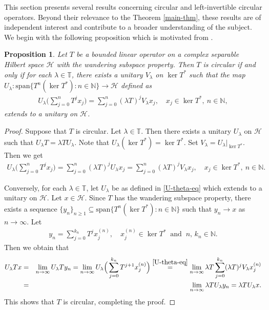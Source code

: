 \documentclass[10pt,a4paper]{amsart}
\newtheorem{proposition}[theorem]{Proposition}%
\newcommand{\beqn}{\begin{eqnarray*}}
\newcommand{\eeqn}{\end{eqnarray*}}
\newcommand{\beq}{\begin{eqnarray}}
\newcommand{\eeq}{\end{eqnarray}}
\newcommand{\rar}{\rightarrow}
\begin{document}
This section presents several results concerning circular and left-invertible circular operators. Beyond their relevance to the Theorem \ref{main-thm}, these results are of independent interest and contribute to a broader understanding of the subject. We begin with the following proposition which is motivated from \cite[Lemma 2.3]{GKMP}.

\begin{proposition}
Let $T$ be a bounded linear operator on a complex separable Hilbert space $\mathcal H$ with the wandering subspace property. Then $T$ is circular if and only if for each $\lambda \in \mathbb T$, there exists a unitary $V_\lambda$ on $\ker T^*$ such that the map $U_\lambda : \mathrm{span}\{T^n(\ker T^*) : n \in \mathbb N\} \rar \mathcal H$ defined as
\beq\label{U-theta-eq}
U_\lambda \Big(\sum_{j=0}^n T^j x_j \Big) = \sum_{j=0}^n (\lambda T)^j V_\lambda x_j, \quad x_j \in \ker T^*, \ n \in \mathbb N,
\eeq
extends to a unitary on $\mathcal H$.
\end{proposition}

\begin{proof}
Suppose that $T$ is circular. Let $\lambda \in \mathbb T$. Then there exists a unitary $U_\lambda$ on $\mathcal H$ such that $U_\lambda T = \lambda T U_\lambda$. Note that $U_\lambda(\ker T^*) = \ker T^*$. Set $V_\lambda = U_\lambda|_{\ker T^*}$. Then we get
\beqn
U_\lambda \Big(\sum_{j=0}^n T^j x_j \Big) = \sum_{j=0}^n (\lambda T)^j U_\lambda x_j = \sum_{j=0}^n (\lambda T)^j V_\lambda x_j, \quad x_j \in \ker T^*, \ n \in \mathbb N.
\eeqn

Conversely, for each $\lambda \in \mathbb T$, let $U_\lambda$ be as defined in \eqref{U-theta-eq} which extends to a unitary on $\mathcal H$. Let $x \in \mathcal H$. Since $T$ has the wandering subspace property, there exists a sequence $\{y_n\}_{n \geqslant 1} \subseteq \mathrm{span}\{T^n(\ker T^*) : n \in \mathbb N\}$ such that $y_n \rar x$ as $n \rar \infty$. Let 
\beqn
y_n = \sum_{j=0}^{k_n} T^j x^{(n)}_j, \quad x_j^{(n)} \in \ker T^* \ \text{ and }\ n,\, k_n \in \mathbb N. 
\eeqn
Then we obtain that
\beqn
U_\lambda T x &=& \lim_{n \rar \infty} U_\lambda T y_n = \lim_{n \rar \infty} U_\lambda \Big(\sum_{j=0}^{k_n} T^{j+1} x^{(n)}_j\Big) \overset{\eqref{U-theta-eq}}= \lim_{n \rar \infty} \lambda T \sum_{j=0}^{k_n} (\lambda T)^j V_\lambda x^{(n)}_j \\
&=& \lim_{n \rar \infty} \lambda T U_\lambda y_n = \lambda T U_\lambda x. 
\eeqn
This shows that $T$ is circular, completing the proof.
\end{proof}
\end{document}
